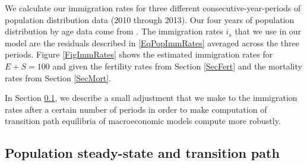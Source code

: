 \documentclass[letterpaper,12pt]{article}
\theoremstyle{definition}
\begin{document}
    We calculate our immigration rates for three different consecutive-year-periods of population distribution data (2010 through 2013). Our four years of population distribution by age data come from \citet{Census:2015}. The immigration rates $i_s$ that we use in our model are the residuals described in \eqref{EqPopImmRates} averaged across the three periods. Figure \ref{FigImmRates} shows the estimated immigration rates for $E+S=100$ and given the fertility rates from Section \ref{SecFert} and the mortality rates from Section \ref{SecMort}.

    In Section \ref{SecPopSSTP}, we describe a small adjustment that we make to the immigration rates after a certain number of periods in order to make computation of transition path equilibria of macroeconomic models compute more robustly.


  \subsection{Population steady-state and transition path}\label{SecPopSSTP}
\end{document}

